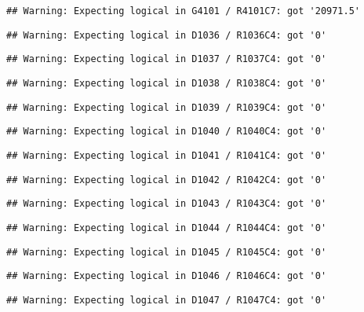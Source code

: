 \documentclass[
]{article}
\begin{document}
\begin{verbatim}
## Warning: Expecting logical in G4101 / R4101C7: got '20971.5'
\end{verbatim}

\begin{verbatim}
## Warning: Expecting logical in D1036 / R1036C4: got '0'
\end{verbatim}

\begin{verbatim}
## Warning: Expecting logical in D1037 / R1037C4: got '0'
\end{verbatim}

\begin{verbatim}
## Warning: Expecting logical in D1038 / R1038C4: got '0'
\end{verbatim}

\begin{verbatim}
## Warning: Expecting logical in D1039 / R1039C4: got '0'
\end{verbatim}

\begin{verbatim}
## Warning: Expecting logical in D1040 / R1040C4: got '0'
\end{verbatim}

\begin{verbatim}
## Warning: Expecting logical in D1041 / R1041C4: got '0'
\end{verbatim}

\begin{verbatim}
## Warning: Expecting logical in D1042 / R1042C4: got '0'
\end{verbatim}

\begin{verbatim}
## Warning: Expecting logical in D1043 / R1043C4: got '0'
\end{verbatim}

\begin{verbatim}
## Warning: Expecting logical in D1044 / R1044C4: got '0'
\end{verbatim}

\begin{verbatim}
## Warning: Expecting logical in D1045 / R1045C4: got '0'
\end{verbatim}

\begin{verbatim}
## Warning: Expecting logical in D1046 / R1046C4: got '0'
\end{verbatim}

\begin{verbatim}
## Warning: Expecting logical in D1047 / R1047C4: got '0'
\end{verbatim}
\end{document}

